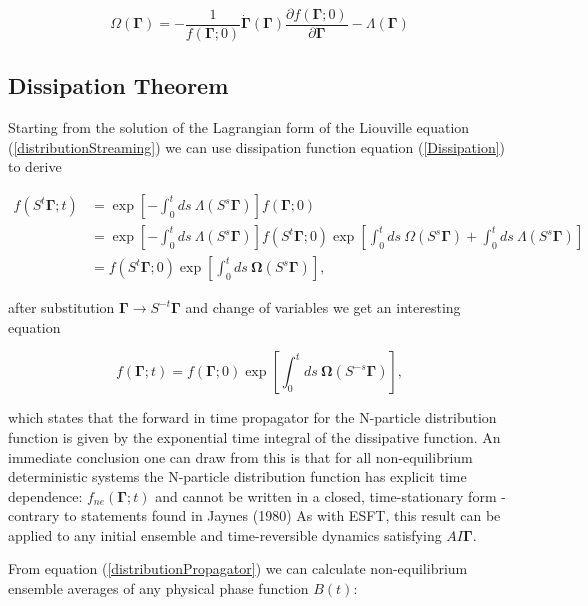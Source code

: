 \documentclass[a4paper,12pt,nofootinbib]{article}
\begin{document}
\begin{equation}
  \Omega(\bm{\Gamma})=-\frac{1}{f(\bm{\Gamma};0)}\dot{\bm{\Gamma}}(\bm{\Gamma})\frac{\partial{f(\bm{\Gamma};0)}}{\partial{\bm{\Gamma}}}-\Lambda(\bm{\Gamma})
\end{equation}

\subsection{Dissipation Theorem}

Starting from the solution of the Lagrangian form of the Liouville equation (\ref{distributionStreaming}) we can use dissipation function equation (\ref{Dissipation}) to derive

\begin{equation}
\begin{aligned}
  f(S^t\bm{\Gamma};t) &= \exp[-\int_0^t ds\ \Lambda(S^s\bm{\Gamma})]f(\bm{\Gamma};0)\\
  &=\exp[-\int_0^t ds\ \Lambda(S^s\bm{\Gamma})]f(S^t \bm{\Gamma};0) \exp[\int_0^t ds\ \Omega(S^s \bm{\Gamma}) + \int_0^t ds\ \Lambda(S^s\bm{\Gamma})]\\
  &=f(S^t \bm{\Gamma};0) \exp[\int_0^t ds\ \bm{\Omega}(S^s \bm{\Gamma})],
\end{aligned}
\end{equation}

after substitution $\bm{\Gamma} \to S^{-t}\bm{\Gamma}$ and change of variables we get an interesting equation

\begin{equation}
\label{distributionPropagator}
    f(\bm{\Gamma};t)=f(\bm{\Gamma};0)\exp[\int_0^t ds\ \bm{\Omega}(S^{-s} \bm{\Gamma})],
\end{equation}

which states that the forward in time propagator for the N-particle distribution function is given by the exponential time integral of the dissipative function. 
An immediate conclusion one can draw from this is that for all non-equilibrium deterministic systems the N-particle distribution function has explicit time dependence: $f_{ne}(\bm{\Gamma};t)$ and cannot be written in a closed, time-stationary form - contrary to statements found in Jaynes (1980)
As with ESFT, this result can be applied to any initial ensemble and time-reversible dynamics satisfying $AI\bm{\Gamma}$.

From equation (\ref{distributionPropagator}) we can calculate non-equilibrium ensemble averages of any physical phase function $B(t)$:
\end{document}
